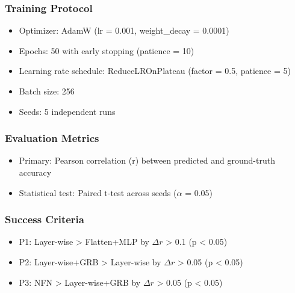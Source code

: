 \begin{table}[htbp]
\centering
{}
\end{table}

\subsubsection{Training Protocol}

\begin{itemize}
\item Optimizer: AdamW (lr = 0.001, weight\_decay = 0.0001)
\item Epochs: 50 with early stopping (patience = 10)
\item Learning rate schedule: ReduceLROnPlateau (factor = 0.5, patience = 5)
\item Batch size: 256
\item Seeds: 5 independent runs
\end{itemize}

\subsubsection{Evaluation Metrics}

\begin{itemize}
\item Primary: Pearson correlation (r) between predicted and ground-truth accuracy
\item Statistical test: Paired t-test across seeds ($\alpha$ = 0.05)
\end{itemize}

\subsubsection{Success Criteria}

\begin{itemize}
\item P1: Layer-wise > Flatten+MLP by $\Delta r$ > 0.1 (p < 0.05)
\item P2: Layer-wise+GRB > Layer-wise by $\Delta r$ > 0.05 (p < 0.05)
\item P3: NFN > Layer-wise+GRB by $\Delta r$ > 0.05 (p < 0.05)
\end{itemize}
